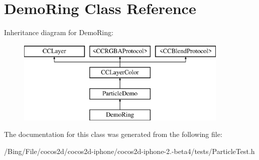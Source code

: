 \hypertarget{interface_demo_ring}{\section{Demo\-Ring Class Reference}
\label{interface_demo_ring}
}
Inheritance diagram for Demo\-Ring\-:\begin{figure}[H]
\begin{center}
\leavevmode
\includegraphics[height=4.000000cm]{interface_demo_ring}
\end{center}
\end{figure}


The documentation for this class was generated from the following file\-:\begin{DoxyCompactItemize}
\item 
/\-Bing/\-File/cocos2d/cocos2d-\/iphone/cocos2d-\/iphone-\/2.-\/beta4/tests/Particle\-Test.\-h\end{DoxyCompactItemize}
